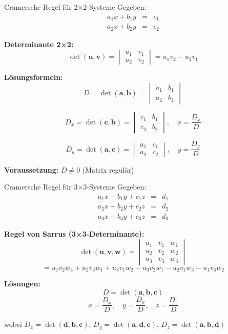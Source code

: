 \documentclass[a4paper, fontsize=7pt]{scrartcl}
\begin{document}
\begin{mainbox}{Cramersche Regel für 2×2-Systeme}
Gegeben:
$$\begin{array}{rcl}
a_1x + b_1y &=& c_1 \\
a_2x + b_2y &=& c_2
\end{array}$$

\textbf{Determinante 2×2:}
$$\det(\mathbf{u}, \mathbf{v}) = \begin{vmatrix} u_1 & v_1 \\ u_2 & v_2 \end{vmatrix} = u_1v_2 - u_2v_1$$

\textbf{Lösungsformeln:}
$$D = \det(\mathbf{a}, \mathbf{b}) = \begin{vmatrix} a_1 & b_1 \\ a_2 & b_2 \end{vmatrix}$$

$$D_x = \det(\mathbf{c}, \mathbf{b}) = \begin{vmatrix} c_1 & b_1 \\ c_2 & b_2 \end{vmatrix}, \quad x = \frac{D_x}{D}$$

$$D_y = \det(\mathbf{a}, \mathbf{c}) = \begin{vmatrix} a_1 & c_1 \\ a_2 & c_2 \end{vmatrix}, \quad y = \frac{D_y}{D}$$

\textbf{Voraussetzung:} $D \neq 0$ (Matrix regulär)
\end{mainbox}

\begin{mainbox}{Cramersche Regel für 3×3-Systeme}
Gegeben:
$$\begin{array}{rcl}
a_1x + b_1y + c_1z &=& d_1 \\
a_2x + b_2y + c_2z &=& d_2 \\
a_3x + b_3y + c_3z &=& d_3
\end{array}$$

\textbf{Regel von Sarrus (3×3-Determinante):}
$$\det(\mathbf{u}, \mathbf{v}, \mathbf{w}) = \begin{vmatrix} u_1 & v_1 & w_1 \\ u_2 & v_2 & w_2 \\ u_3 & v_3 & w_3 \end{vmatrix}$$
$$= u_1v_2w_3 + u_2v_3w_1 + u_3v_1w_2 - u_3v_2w_1 - u_2v_1w_3 - u_1v_3w_2$$

\textbf{Lösungen:}
$$D = \det(\mathbf{a}, \mathbf{b}, \mathbf{c})$$
$$x = \frac{D_x}{D}, \quad y = \frac{D_y}{D}, \quad z = \frac{D_z}{D}$$

wobei $D_x = \det(\mathbf{d}, \mathbf{b}, \mathbf{c})$, $D_y = \det(\mathbf{a}, \mathbf{d}, \mathbf{c})$, $D_z = \det(\mathbf{a}, \mathbf{b}, \mathbf{d})$
\end{mainbox}
\end{document}
